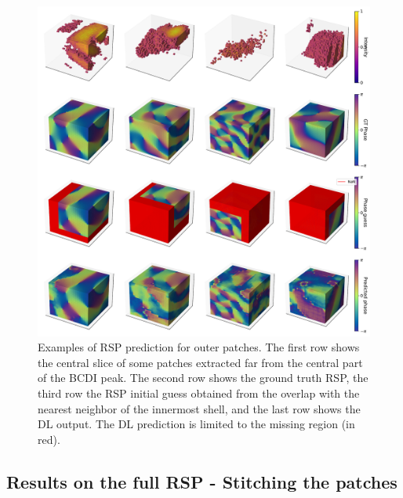 \begin{figure}[H]
    \centering
    \includegraphics[width=\textwidth]{figures/Phasing/outer_patches_3D_lowstrain.pdf}
    \caption{Examples of RSP prediction for outer patches. The first row shows the central slice of some patches extracted 
    far from the central part of the BCDI peak. The second row shows the ground truth RSP, the third row the RSP initial guess 
    obtained from the overlap with the nearest neighbor of the innermost shell, and the last row shows the 
    DL output. The DL prediction is limited to the missing region (in red). }

    \label{fig:outerpatch_obj_lowstrain}
\end{figure}

\subsection{Results on the full RSP - Stitching the patches}

